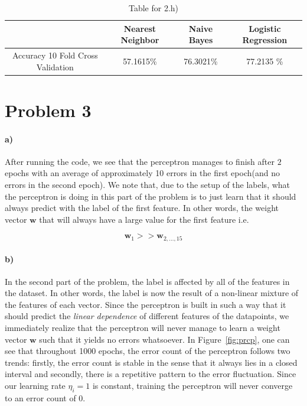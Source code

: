 \documentclass{article}
\begin{document}
\begin{table}[ht]
    \begin{center}
    \begin{tabular}{|c|c|c|c|}
   \hline
        & Nearest Neighbor & Naive Bayes & Logistic Regression \\ \hline
         Accuracy 10 Fold Cross Validation &  57.1615\%&76.3021\% &  77.2135 \%  \\ \hline
        \end{tabular}\caption{Table for 2.h)}
    \end{center}
\end{table}


\section{Problem 3}

\paragraph{a)}
After running the code, we see that the perceptron manages to finish after $2$ epochs with an average of approximately 10 errors in the first epoch(and no errors in the second epoch). We note that, due to the setup of the labels, what the perceptron is doing in this part of the problem is to just learn that it should always predict with the label of the first feature. In other words, the weight vector $\mathbf{w}$ that will always have a large value for the first feature i.e.

\[
\mathbf{w}_1 >> \mathbf{w}_{2,\hdots,15} 
\]

\paragraph{b)}
In the second part of the problem, the label is affected by all of the features in the dataset. In other words, the label is now the result of a non-linear mixture of the features of each vector. Since the perceptron is built in such a way that it should predict the \textit{linear dependence} of different features of the datapoints, we immediately realize that the perceptron will never manage to learn a weight vector $\mathbf{w}$ such that it yields no errors whatsoever. In Figure~\ref{fig:prcp}, one can see that throughout 1000 epochs, the error count of the perceptron follows two trends: firstly, the error count is stable in the sense that it always lies in a closed interval and secondly, there is a repetitive pattern to the error fluctuation. Since our learning rate $\eta_i=1$ is constant, training the perceptron will never converge to an error count of 0.
\end{document}
